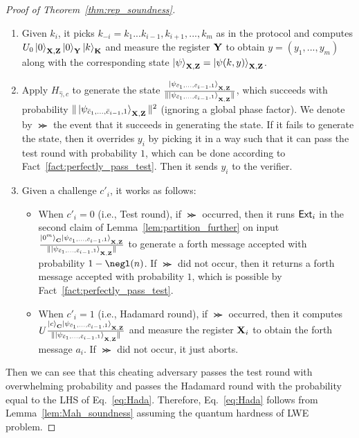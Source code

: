 \begin{proof}[Proof of Theorem~\ref{thm:rep_soundness}]
\begin{enumerate}
    \item Given $k_i$, it picks $k_{-i}=k_1...k_{i-1},k_{i+1},...,k_{m}$ as in the protocol and computes $U_0\ket{0}_{\mathbf{X},\mathbf{Z}}\ket{0}_{\mathbf{Y}}\ket{k}_{\mathbf{K}}$ and measure the register $\mathbf{Y}$ to obtain $y=(y_1,...,y_m)$ along with the corresponding state $\ket{\psi}_{\mathbf{X},\mathbf{Z}}=\ket{\psi(k,y)}_{\mathbf{X},\mathbf{Z}}$.
    \item Apply $H_{\hat{\gamma},c}$ to generate the state $\frac{\ket{\psi_{\bar{c}_1,\dots,\bar{c}_{i-1},1}}_{\mathbf{X},\mathbf{Z}}}{\|\ket{\psi_{\bar{c}_1,\dots,\bar{c}_{i-1},1}}_{\mathbf{X},\mathbf{Z}}\|}$, which succeeds with probability $\|\ket{\psi_{\bar{c}_1,\dots,\bar{c}_{i-1},1}}_{\mathbf{X},\mathbf{Z}}\|^2$ (ignoring a global phase factor).
    We denote by $\Succ$ the event that it succeeds in generating the state.
    If it fails to generate the state, then it overrides $y_i$ by picking it in a way such that it can pass the test round with probability $1$, which can be done according to Fact~\ref{fact:perfectly_pass_test}.
    Then it sends $y_i$ to the verifier.
    \item Given a challenge $c'_i$, it works as follows:
    \begin{itemize}
     \item When $c'_i=0$ (i.e., Test round), if $\Succ$ occurred, then it runs $\mathsf{Ext}_i$ in the second claim of Lemma~\ref{lem:partition_further} on input $\frac{\ket{0^m}_{\mathbf{C}}\ket{\psi_{\bar{c}_1,\dots,\bar{c}_{i-1},1}}_{\mathbf{X},\mathbf{Z}}}{\|\ket{\psi_{\bar{c}_1,\dots,\bar{c}_{i-1},1}}_{\mathbf{X},\mathbf{Z}}\|}$ to generate a forth message accepted with probability $1-\negl(\secpar)$. 
     If $\Succ$ did not occur, then it returns a forth message accepted with probability $1$, which is possible by Fact~\ref{fact:perfectly_pass_test}.
    \item When $c'_i=1$ (i.e., Hadamard round), if $\Succ$ occurred, then it computes  $U\frac{\ket{c}_{\mathbf{C}}\ket{\psi_{\bar{c}_1,\dots,\bar{c}_{i-1},1}}_{\mathbf{X},\mathbf{Z}}}{\|\ket{\psi_{\bar{c}_1,\dots,\bar{c}_{i-1},1}}_{\mathbf{X},\mathbf{Z}}\|}$ and measure the register $\mathbf{X}_i$ to obtain the forth message $a_i$.
    If $\Succ$ did not occur, it just aborts.
    \end{itemize}
\end{enumerate}
Then we can see that this cheating adversary passes the test round with overwhelming probability and passes the Hadamard round with the probability equal to the LHS of Eq.~\ref{eq:Hada}.
Therefore, Eq.~\ref{eq:Hada} follows from Lemma~\ref{lem:Mah_soundness} assuming the quantum hardness of LWE problem.


\end{proof}
